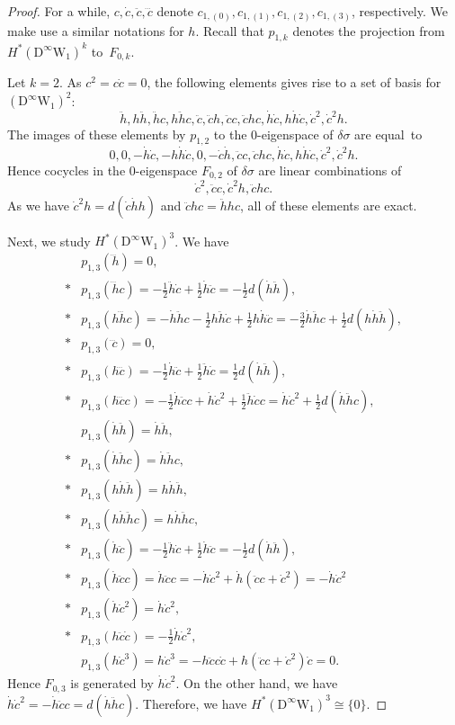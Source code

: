 \documentclass[10pt,a4paper]{amsart}
\newcommand{\D}{\mathrm{D}}
\newcommand{\W}{\mathrm{W}}
\begin{document}
\begin{proof}
For a while, $c,\dot{c},\ddot{c},\dddot{c}$ denote $c_{1,(0)},c_{1,(1)},c_{1,(2)},c_{1,(3)}$, respectively.
We make use a similar notations for $h$.
Recall that $p_{1,k}$ denotes the projection from $H^*(\D^\infty\W_1)^k$ to~$F_{0,k}$.

Let $k=2$.
As $c^2=c\dot{c}=0$, the following elements gives rise to a set of basis for $(\D^\infty\W_1)^2$:
\[
\ddot{h}, h\ddot{h}, \ddot{h}c, h\ddot{h}c,%
\ddot{c}, \ddot{c}h, \ddot{c}c, \ddot{c}hc,%
\dot{h}\dot{c}, h\dot{h}\dot{c},%
\dot{c}^2, \dot{c}^2h.
\]
The images of these elements by $p_{1,2}$ to the $0$-eigenspace of $\delta\sigma$ are equal~to
\[
0, 0, -\dot{h}\dot{c},-h\dot{h}\dot{c},%
0, -\dot{c}\dot{h}, \ddot{c}c, \ddot{c}hc,%
\dot{h}\dot{c},h\dot{h}\dot{c},%
\dot{c}^2,\dot{c}^2h.
\]
Hence cocycles in the $0$-eigenspace $F_{0,2}$ of $\delta\sigma$ are linear combinations of
\[
\dot{c}^2,\ddot{c}c,\dot{c}^2h,\ddot{c}hc.
\]
As we have $\dot{c}^2h=d(\dot{c}\dot{h}h)$ and $\ddot{c}hc=\ddot{h}hc$, all of these elements are exact.

Next, we study $H^*(\D^\infty\W_1)^3$.
We have
\begin{align*}
&p_{1,3}(\dddot{h})=0,\\*
&p_{1,3}(\dddot{h}c)=-\frac12\ddot{h}\dot{c}+\frac12\dot{h}\ddot{c}=-\frac12d(\dot{h}\ddot{h}),\\*
&p_{1,3}(h\dddot{h}c)=-\dot{h}\ddot{h}c-\frac12h\ddot{h}\dot{c}+\frac12h\dot{h}\ddot{c}=-\frac32\dot{h}\ddot{h}c+\frac12d(h\dot{h}\ddot{h}),\\*
&p_{1,3}(\dddot{c})=0,\\*
&p_{1,3}(h\dddot{c})=-\frac12\dot{h}\ddot{c}+\frac12\ddot{h}\dot{c}=\frac12d(\dot{h}\ddot{h}),\\*
&p_{1,3}(h\dddot{c}c)=-\frac12\dot{h}\ddot{c}c+\dot{h}\dot{c}^2+\frac12\ddot{h}\dot{c}c=\dot{h}\dot{c}^2+\frac12d(\dot{h}\ddot{h}c),\\
&p_{1,3}(\dot{h}\ddot{h})=\dot{h}\ddot{h},\\*
&p_{1,3}(\dot{h}\ddot{h}c)=\dot{h}\ddot{h}c,\\*
&p_{1,3}(h\dot{h}\ddot{h})=h\dot{h}\ddot{h},\\*
&p_{1,3}(h\dot{h}\ddot{h}c)=h\dot{h}\ddot{h}c,\\*
&p_{1,3}(\dot{h}\ddot{c})=-\frac12\ddot{h}\dot{c}+\frac12\dot{h}\ddot{c}=-\frac12d(\dot{h}\ddot{h}),\\*
&p_{1,3}(\dot{h}\ddot{c}c)=\dot{h}\ddot{c}c=-\dot{h}\dot{c}^2+\dot{h}(\ddot{c}c+\dot{c}^2)=-\dot{h}\dot{c}^2\\*
&p_{1,3}(\dot{h}\dot{c}^2)=\dot{h}\dot{c}^2,\\*
&p_{1,3}(h\ddot{c}\dot{c})=-\frac12\dot{h}\dot{c}^2,\\
&p_{1,3}(h\dot{c}^3)=h\dot{c}^3=-h\ddot{c}c\dot{c}+h(\ddot{c}c+\dot{c}^2)\dot{c}=0.
\end{align*}
Hence $F_{0,3}$ is generated by $\dot{h}\dot{c}^2$.
On the other hand, we have $\dot{h}\dot{c}^2=-\dot{h}\ddot{c}c=d(\dot{h}\ddot{h}c)$.
Therefore, we have $H^*(\D^\infty\W_1)^3\cong\{0\}$.


\end{proof}
\end{document}
